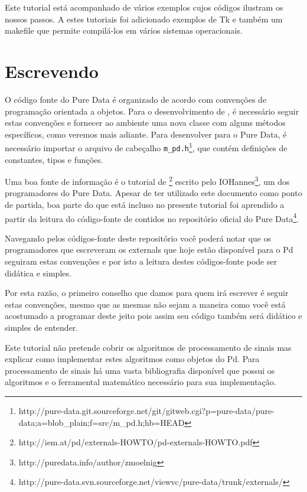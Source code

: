 Este tutorial está acompanhado de vários exemplos cujos códigos ilustram os nossos
passos. A estes tutoriais foi adicionado exemplos de Tk e também um makefile que
permite compilá-los em vários sistemas operacionais.

\section{Escrevendo \externals}

O código fonte do Pure Data é organizado de acordo com convenções de
programação orientada a objetos. Para o desenvolvimento de \externals, é
necessário seguir estas convenções e fornecer ao ambiente uma nova classe com
alguns métodos específicos, como veremos mais adiante. Para desenvolver para o
Pure Data, é necessário importar o arquivo de cabeçalho
\texttt{m\_pd.h}\footnote{http://pure-data.git.sourceforge.net/git/gitweb.cgi?p=pure-data/pure-data;a=blob\_plain;f=src/m\_pd.h;hb=HEAD},
que contém definições de constantes, tipos e funções.

Uma boa fonte de informação é o tutorial de
\externals\footnote{http://iem.at/pd/externals-HOWTO/pd-externals-HOWTO.pdf}
escrito pelo IOHannes\footnote{http://puredata.info/author/zmoelnig}, um dos
programadores do Pure Data. Apesar de ter utilizado este documento como ponto
de partida, boa parte do que está incluso no presente tutorial foi aprendido a
partir da leitura do código-fonte de \externals contidos no repositório
oficial do Pure
Data\footnote{http://pure-data.svn.sourceforge.net/viewvc/pure-data/trunk/externals/}.

Navegando pelos códigos-fonte deste repositório você poderá notar que os programadores
que escreveram os externals que hoje estão disponível para o Pd seguiram estas convenções
e por isto a leitura destes códigos-fonte pode ser didática e simples.

Por esta razão, o primeiro conselho que damos para quem irá escrever \externals é seguir
estas convenções, mesmo que as mesmas não sejam a maneira como você está acostumado a 
programar deste jeito pois assim seu código também será didático e simples de entender.

Este tutorial não pretende cobrir os algoritmos de processamento de sinais mas explicar
como implementar estes algoritmos como objetos do Pd. Para processamento de sinais há
uma vasta bibliografia disponível que possui os algoritmos e o ferramental matemático
necessário para sua implementação.

 

